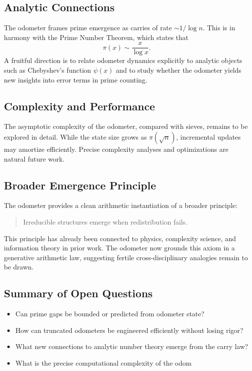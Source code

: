 \documentclass[12pt]{article}
\theoremstyle{definition}
\theoremstyle{remark}
\begin{document}
\subsection{Analytic Connections}

The odometer frames prime emergence as carries of rate $\sim 1/\log n$. This is in harmony with
the Prime Number Theorem, which states that
\[
\pi(x) \sim \frac{x}{\log x}.
\]
A fruitful direction is to relate odometer dynamics explicitly to analytic objects such as
Chebyshev’s function $\psi(x)$ and to study whether the odometer yields new insights into error
terms in prime counting.

\subsection{Complexity and Performance}

The asymptotic complexity of the odometer, compared with sieves, remains to be explored in detail.
While the state size grows as $\pi(\sqrt{n})$, incremental updates may amortize efficiently.
Precise complexity analyses and optimizations are natural future work.

\subsection{Broader Emergence Principle}

The odometer provides a clean arithmetic instantiation of a broader principle:

\begin{quote}
Irreducible structures emerge when redistribution fails.
\end{quote}

This principle has already been connected to physics, complexity science, and information theory in
prior work. The odometer now grounds this axiom in a generative arithmetic law, suggesting fertile
cross-disciplinary analogies remain to be drawn.

\subsection{Summary of Open Questions}

\begin{itemize}
  \item Can prime gaps be bounded or predicted from odometer state?
  \item How can truncated odometers be engineered efficiently without losing rigor?
  \item What new connections to analytic number theory emerge from the carry law?
  \item What is the precise computational complexity of the odom
\end{itemize}
\end{document}
